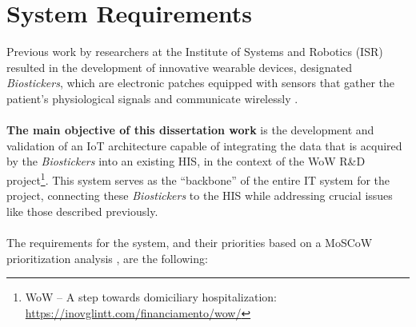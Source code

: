 
\section{System Requirements}

Previous work by researchers at the Institute of Systems and Robotics (ISR) resulted in the development of innovative wearable devices, designated \textit{Biostickers}, which are electronic patches equipped with sensors that gather the patient's physiological signals and communicate wirelessly \cite{Silva2020}. 


\paragraph{} \textbf{The main objective of this dissertation work} is the development and validation of an \acs{IoT} architecture capable of integrating the data that is acquired by the \textit{Biostickers} into an existing \acs{HIS}, in the context of the \acs{WoW} R\&D project\footnote{WoW -- A step towards domiciliary hospitalization: \url{https://inovglintt.com/financiamento/wow/}}. This system serves as the ``backbone'' of the entire \acf{IT} system for the project, connecting these \textit{Biostickers} to the \acs{HIS} while addressing crucial issues like those described previously.


\paragraph{} The requirements for the system, and their priorities based on a MoSCoW prioritization analysis \cite{stapleton1997dsdm}, are the following: 


